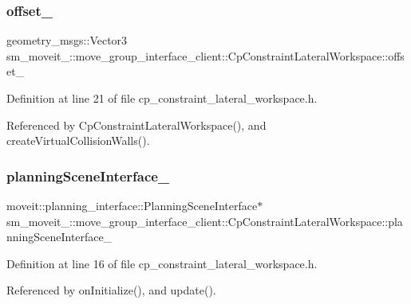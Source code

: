 \subsubsection{\texorpdfstring{offset\+\_\+}{offset\_}}
{\footnotesize\ttfamily geometry\+\_\+msgs\+::\+Vector3 sm\+\_\+moveit\+\_\+::move\+\_\+group\+\_\+interface\+\_\+client\+::\+Cp\+Constraint\+Lateral\+Workspace\+::offset\+\_\+\hspace{0.3cm}{\ttfamily [private]}}



Definition at line 21 of file cp\+\_\+constraint\+\_\+lateral\+\_\+workspace.\+h.



Referenced by Cp\+Constraint\+Lateral\+Workspace(), and create\+Virtual\+Collision\+Walls().

\mbox{\label{classsm__moveit__4_1_1move__group__interface__client_1_1CpConstraintLateralWorkspace_a4fc20ba3e0f44b4a85b1db67d3d6ce28}} 
\subsubsection{\texorpdfstring{planning\+Scene\+Interface\+\_\+}{planningSceneInterface\_}}
{\footnotesize\ttfamily moveit\+::planning\+\_\+interface\+::\+Planning\+Scene\+Interface$\ast$ sm\+\_\+moveit\+\_\+::move\+\_\+group\+\_\+interface\+\_\+client\+::\+Cp\+Constraint\+Lateral\+Workspace\+::planning\+Scene\+Interface\+\_\+\hspace{0.3cm}{\ttfamily [private]}}



Definition at line 16 of file cp\+\_\+constraint\+\_\+lateral\+\_\+workspace.\+h.



Referenced by on\+Initialize(), and update().


